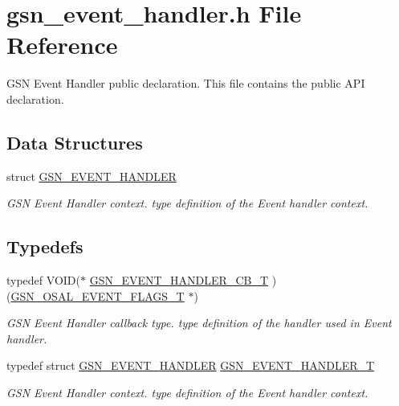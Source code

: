 \hypertarget{a00494}{
\section{gsn\_\-event\_\-handler.h File Reference}
\label{a00494}
}


GSN Event Handler public declaration. This file contains the public API declaration.  


\subsection*{Data Structures}
\begin{DoxyCompactItemize}
\item 
struct \hyperlink{a00069}{GSN\_\-EVENT\_\-HANDLER}
\begin{DoxyCompactList}\small\item\em GSN Event Handler context. type definition of the Event handler context. \end{DoxyCompactList}\end{DoxyCompactItemize}
\subsection*{Typedefs}
\begin{DoxyCompactItemize}
\item 
typedef VOID($\ast$ \hyperlink{a00622_ga570a795e4730bcaa1c17b58223336526}{GSN\_\-EVENT\_\-HANDLER\_\-CB\_\-T} )(\hyperlink{a00628_gab93fdfc637101a29260ca105d3eb924e}{GSN\_\-OSAL\_\-EVENT\_\-FLAGS\_\-T} $\ast$)
\begin{DoxyCompactList}\small\item\em GSN Event Handler callback type. type definition of the handler used in Event handler. \end{DoxyCompactList}\item 
typedef struct \hyperlink{a00069}{GSN\_\-EVENT\_\-HANDLER} \hyperlink{a00622_ga6b24ca227651d8ca08bb5e95b709dc49}{GSN\_\-EVENT\_\-HANDLER\_\-T}
\begin{DoxyCompactList}\small\item\em GSN Event Handler context. type definition of the Event handler context. \end{DoxyCompactList}\end{DoxyCompactItemize}
